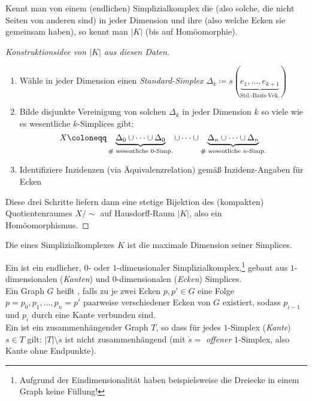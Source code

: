 \begin{remark}
  Kennt man von einem (endlichen) Simplizialkomplex die \label{def:wesentlicheSimplices} (also solche, die nicht Seiten von anderen sind) in jeder Dimension und ihre \label{def:inzidenzen} (also welche Ecken sie gemeinsam haben), so kennt man \( \vert K \vert \) (bis auf Homöomorphie).
  \begin{proof}[Konstruktionsidee von \( \vert K \vert \) aus diesen Daten]
    \
    \begin{enumerate}
      \item Wähle in jeder Dimension einen \emph{Standard-Simplex} \( \Delta_k \coloneqq s(\underbrace{e_1, \dots, e_{k+1}}_{\text{Std.-Basis-Vek.}}) \)
      \item Bilde disjunkte Vereinigung von solchen \( \Delta_k \) in jeder Dimension \( k \) so viele wie es wesentliche \( k \)-Simplices gibt:
        \begin{equation*}
          X \coloneqq \underbrace{\Delta_0 \cup \dots \cup \Delta_0}_{\text{\# wesentliche \( 0 \)-Simp.}} \cup \dots \cup \underbrace{\Delta_n \cup \dots \cup \Delta_n}_{\text{\# wesentliche \( n \)-Simp.}}
        \end{equation*}
      \item Identifiziere Inzidenzen (via Äquivalenzrelation) gemäß Inzidenz-Angaben für Ecken
    \end{enumerate}
    Diese drei Schritte liefern dann eine stetige Bijektion des (kompakten) Quotientenraumes \( X/\sim \) auf Hausdorff-Raum \( \vert K \vert \), also ein Homöomorphismus.
  \end{proof}
\end{remark}

\begin{definition}[Dimension]
  Die  eines Simplizialkomplexes \( K \) ist die maximale Dimension seiner Simplices.
\end{definition}

\begin{remark}
  Ein \label{def:graph} ist ein endlicher, \( 0 \)- oder \( 1 \)-dimensionaler Simplizialkomplex,\footnote{Aufgrund der Eindimensionalität haben beispielsweise die Dreiecke in einem Graph keine Füllung!} gebaut aus \( 1 \)-dimensionalen (\emph{Kanten}) und \( 0 \)-dimensionalen (\emph{Ecken}) Simplices. \\
  Ein Graph \( G \) heißt \term{zusammenhängend}\label{def:zusammenhaengend}, falls zu je zwei Ecken \( p, p' \in G \) eine Folge \( p = p_0, p_1, \dots, p_n = p' \) paarweise verschiedener Ecken von \( G \) existiert, sodass \( p_{i-1} \) und \( p_i \) durch eine Kante verbunden sind. \\
  Ein \term{Baum}\label{def:baum} ist ein zusammenhängender Graph \( T \), so dass für jedes \( 1 \)-Simplex (\emph{Kante}) \( s \in T \) gilt: \( \vert T \vert \setminus \mathring{s} \) ist nicht zusammenhängend (mit \( \mathring{s} = \) \emph{offener} \( 1 \)-Simplex, also Kante ohne Endpunkte).
\end{remark}

